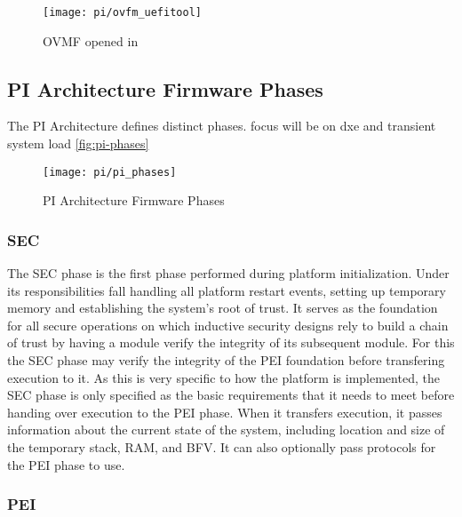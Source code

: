 \begin{figure}[htb]%
    \centering%
    \texttt{[image: pi/ovfm\_uefitool]}%
    \caption{\ac{OVMF} opened in }%
    \label{fig:ovmf-in-uefitool}%
\end{figure}


\subsection{\acs{PI} Architecture Firmware Phases}

The \ac{PI} Architecture defines distinct phases.
focus will be on dxe and transient system load
\autoref{fig:pi-phases}



\begin{figure}[htb]%
    \centering%
    \texttt{[image: pi/pi\_phases]}%
    \caption{\ac{PI} Architecture Firmware Phases \cite[Figure 2-1]{pi-spec}}%
    \label{fig:pi-phases}%
\end{figure}


\subsubsection{\acf{SEC}}

The \ac{SEC} phase is the first phase performed during platform initialization.
Under its responsibilities fall handling all platform restart events, setting up temporary memory and establishing the system's root of trust.
It serves as the foundation for all secure operations on which inductive security designs rely to build a chain of trust by having a module verify the integrity of its subsequent module.
For this the \ac{SEC} phase may verify the integrity of the \ac{PEI} foundation before transfering execution to it.
As this is very specific to how the platform is implemented, the \ac{SEC} phase is only specified as the basic requirements that it needs to meet before handing over execution to the \ac{PEI} phase.
When it transfers execution, it passes information about the current state of the system, including location and size of the temporary stack, \ac{RAM}, and \ac{BFV}.
It can also optionally pass protocols for the \ac{PEI} phase to use.

\subsubsection{\acf{PEI}}

